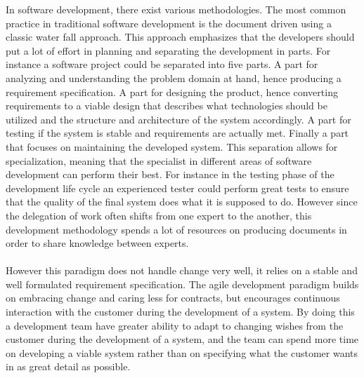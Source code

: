 In software development, there exist various methodologies. The most common practice in traditional software development is the document driven using a classic water fall approach. This approach emphasizes that the developers should put a lot of effort in planning and separating the development in parts. For instance a software project could be separated into five parts. A part for analyzing and understanding the problem domain at hand, hence producing a requirement specification. A part for designing the product, hence converting requirements to a viable design that describes what technologies should be utilized and the structure and architecture of the system accordingly. A part for testing if the system is stable and requirements are actually met. Finally a part that focuses on maintaining the developed system. This separation allows for specialization, meaning that the specialist in different areas of software development can perform their best. For instance in the testing phase of the development life cycle an experienced tester could perform great tests to ensure that the quality of the final system does what it is supposed to do. However since the delegation of work often shifts from one expert to the another, this development methodology spends a lot of resources on producing documents in order to share knowledge between experts. 
\\\\
However this paradigm does not handle change very well, it relies on a stable and well formulated requirement specification. The agile development paradigm builds on embracing change and caring less for contracts, but encourages continuous interaction with the customer during the development of a system. By doing this a development team have greater ability to adapt to changing wishes from the customer during the development of a system, and the team can spend more time on developing a viable system rather than on specifying what the customer wants in as great detail as possible.
\\\\





